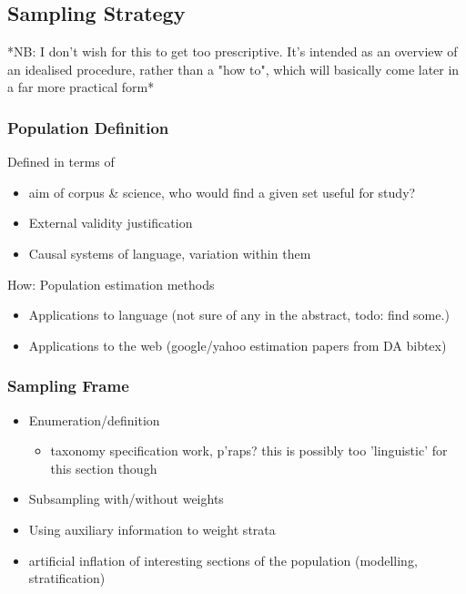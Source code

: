\subsection{Sampling Strategy}
*NB: I don't wish for this to get too prescriptive.  It's intended as an overview of an idealised procedure, rather than a "how to", which will basically come later in a far more practical form*

\subsubsection{Population Definition}
Defined in terms of

\begin{itemize}
 \item aim of corpus \& science, who would find a given set useful for study?
 \item External validity justification
 \item Causal systems of language, variation within them
\end{itemize}

How: Population estimation methods

\begin{itemize}
 \item Applications to language (not sure of any in the abstract, todo: find some.)
 \item Applications to the web (google/yahoo estimation papers from DA bibtex)
\end{itemize}




\subsubsection{Sampling Frame}

\begin{itemize}
 \item Enumeration/definition
    \begin{itemize}
    \item taxonomy specification work, p'raps?  this is possibly too 'linguistic' for this section though
    \end{itemize}
 \item Subsampling with/without weights
 \item Using auxiliary information to weight strata
 \item artificial inflation of interesting sections of the population (modelling, stratification)
\end{itemize}



